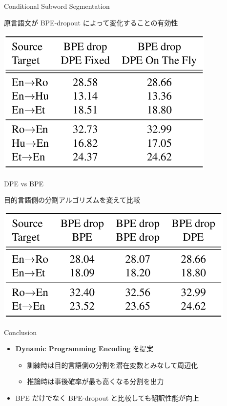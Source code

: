 \documentclass[unicode, 12pt, aspectratio=43]{beamer}
\begin{document}
\begin{frame}[label={sec:org8803bfb}]{Conditional Subword Segmentation}
\begin{block}{\small 原言語文が BPE-dropout によって変化することの有効性}
\begin{center}
\includegraphics[width=0.5\linewidth]{./figure/Table6.pdf}
\end{center}
\end{block}
\end{frame}

\begin{frame}[label={sec:org88a6c66}]{DPE vs BPE}
\begin{block}{目的言語側の分割アルゴリズムを変えて比較}
\begin{center}
\includegraphics[width=0.5\linewidth]{./figure/Table7.pdf}
\end{center}
\end{block}
\end{frame}

\begin{frame}[label={sec:org78a33c0}]{Conclusion}
\begin{itemize}
\item \textbf{Dynamic Programming Encoding} を提案
\begin{itemize}
\item 訓練時は目的言語側の分割を潜在変数とみなして周辺化
\item 推論時は事後確率が最も高くなる分割を出力
\end{itemize}
\item BPE だけでなく BPE-dropout と比較しても翻訳性能が向上
\end{itemize}
\end{frame}
\end{document}
